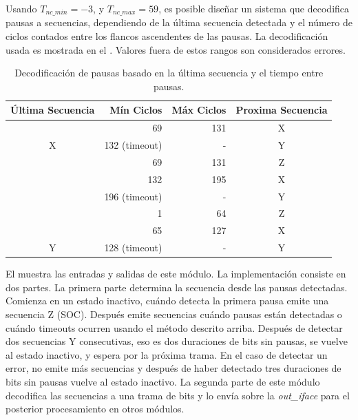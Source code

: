 \documentclass[a4paper, twoside, 11pt]{report}
\begin{document}
Usando $T_{nc\_min} = -3$, y $T_{nc\_max} = 59$, es posible diseñar un sistema que decodifica pausas a secuencias, dependiendo de la última secuencia detectada y el número de ciclos contados entre los flancos ascendentes de las pausas. La decodificación usada es mostrada en el . Valores fuera de estos rangos son considerados errores.

\begin{table}[htb]
  \centering
  \begin{tabular}{c|r|r|c}
    \rowcolor{lightgray!35}
    \textbf{Última Secuencia} & \textbf{Mín Ciclos} & \textbf{Máx Ciclos} & \textbf{Proxima Secuencia} \\
    \hline
                        & 69             & 131   & X \\
    \multirow{-2}{*}{X} & 132 (timeout)  & -     & Y \\
    \rowcolor{lightgray!35}
                        & 69             & 131   & Z \\
    \rowcolor{lightgray!35}
                        & 132            & 195   & X \\
    \rowcolor{lightgray!35}
    \multirow{-3}{*}{Z} & 196 (timeout)  & -     & Y \\
                        & 1              & 64    & Z \\
                        & 65             & 127   & X \\
    \multirow{-3}{*}{Y} & 128 (timeout)  & -     & Y \\
  \end{tabular}
  \caption{Decodificación de pausas basado en la última secuencia y el tiempo entre pausas.}
  \label{tab:sequence_decode_timings}
\end{table}

El  muestra las entradas y salidas de este módulo. La implementación consiste en dos partes. La primera parte determina la secuencia desde las pausas detectadas. Comienza en un estado inactivo, cuándo detecta la primera pausa emite una secuencia Z (SOC). Después emite secuencias cuándo pausas están detectadas o cuándo timeouts ocurren usando el método descrito arriba. Después de detectar dos secuencias Y consecutivas, eso es dos duraciones de bits sin pausas, se vuelve al estado inactivo, y espera por la próxima trama. En el caso de detectar un error, no emite más secuencias y después de haber detectado tres duraciones de bits sin pausas vuelve al estado inactivo. La segunda parte de este módulo decodifica las secuencias a una trama de bits y lo envía sobre la \textit{out\_iface} para el posterior procesamiento en otros módulos.
\end{document}

